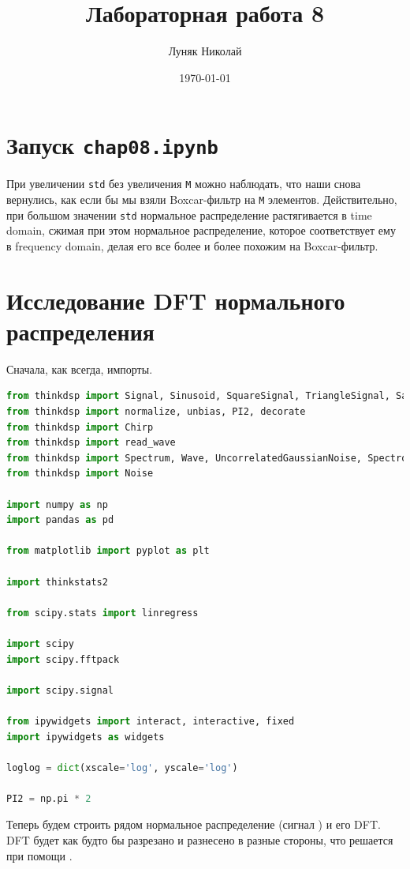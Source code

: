 \documentclass[a4paper,12pt]{report}
\author{Луняк Николай}
\title{Лабораторная работа 8}
\date{\today}
\begin{document}
    \maketitle
    \tableofcontents
    \listoffigures
    \lstlistoflistings
    
    \chapter{Запуск \texttt{chap08.ipynb}}
    
    При увеличении \texttt{std} без увеличения \texttt{M} можно наблюдать, что наши  снова вернулись, как если бы мы взяли Boxcar-фильтр на \texttt{M} элементов. Действительно, при большом значении \texttt{std} нормальное распределение растягивается в time domain, сжимая при этом нормальное распределение, которое соответствует ему в frequency domain, делая его все более и более похожим на Boxcar-фильтр.
    
    \chapter{Исследование DFT нормального распределения}
    
    Сначала, как всегда, импорты.
    
\begin{lstlisting}[language=Python,caption=Импорты]
from thinkdsp import Signal, Sinusoid, SquareSignal, TriangleSignal, SawtoothSignal, ParabolicSignal
from thinkdsp import normalize, unbias, PI2, decorate
from thinkdsp import Chirp
from thinkdsp import read_wave
from thinkdsp import Spectrum, Wave, UncorrelatedGaussianNoise, Spectrogram
from thinkdsp import Noise

import numpy as np
import pandas as pd

from matplotlib import pyplot as plt

import thinkstats2

from scipy.stats import linregress

import scipy
import scipy.fftpack

import scipy.signal

from ipywidgets import interact, interactive, fixed
import ipywidgets as widgets

loglog = dict(xscale='log', yscale='log')

PI2 = np.pi * 2
\end{lstlisting}

    Теперь будем строить рядом нормальное распределение (сигнал ) и его DFT. DFT будет как будто бы разрезано и разнесено в разные стороны, что решается при помощи .
    
\end{document}
